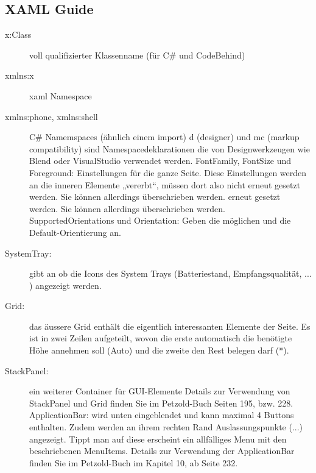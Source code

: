 \documentclass[a4paper,10pt]{scrreprt}
\begin{document}
\subsection{XAML Guide}
\begin{description}

\item [x:Class] voll qualifizierter Klassenname (für C\# und CodeBehind)
\item [xmlns:x] xaml Namespace
\item [xmlns:phone, xmlns:shell] C\# Namemspaces (ähnlich einem import)
d (designer) und mc (markup compatibility) sind Namespacedeklarationen die von
Designwerkzeugen wie Blend oder VisualStudio verwendet werden.
FontFamily, FontSize und Foreground: Einstellungen für die ganze Seite. Diese
Einstellungen werden an die inneren Elemente „vererbt“, müssen dort also nicht
erneut gesetzt werden. Sie können allerdings überschrieben werden.
erneut gesetzt werden. Sie können allerdings überschrieben werden.
SupportedOrientations und Orientation: Geben die möglichen und die Default-Orientierung an.
\item[SystemTray:] gibt an ob die Icons des System Trays (Batteriestand, Empfangsqualität, ... ) angezeigt werden.
\item[Grid:] das äussere Grid enthält die eigentlich interessanten Elemente der Seite. Es ist in zwei Zeilen aufgeteilt,
wovon die erste automatisch die benötigte Höhe annehmen soll (Auto) und die zweite den Rest belegen
darf (*).
\item[StackPanel:] ein weiterer Container für GUI-Elemente
Details zur Verwendung von StackPanel und Grid finden Sie im Petzold-Buch Seiten 195, bzw. 228.
ApplicationBar: wird unten eingeblendet und kann maximal 4 Buttons enthalten. Zudem werden an ihrem
rechten Rand Auslassungspunkte (...) angezeigt. Tippt man auf diese erscheint ein allfälliges Menu mit
den beschriebenen MenuItems.
Details zur Verwendung der ApplicationBar finden Sie im Petzold-Buch im Kapitel 10, ab Seite 232.
\end{description}
\end{document}
